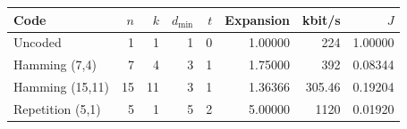 \begin{tabular}{lrrrrrrr}
\toprule
Code & $n$ & $k$ & $d_{\min}$ & $t$ & Expansion & kbit/s & $J$ \\
\midrule
Uncoded & 1 & 1 & 1 & 0 & 1.00000 & 224 & 1.00000 \\
Hamming (7,4) & 7 & 4 & 3 & 1 & 1.75000 & 392 & 0.08344 \\
Hamming (15,11) & 15 & 11 & 3 & 1 & 1.36366 & 305.46 & 0.19204 \\
Repetition (5,1) & 5 & 1 & 5 & 2 & 5.00000 & 1120 & 0.01920 \\
\bottomrule
\end{tabular}
